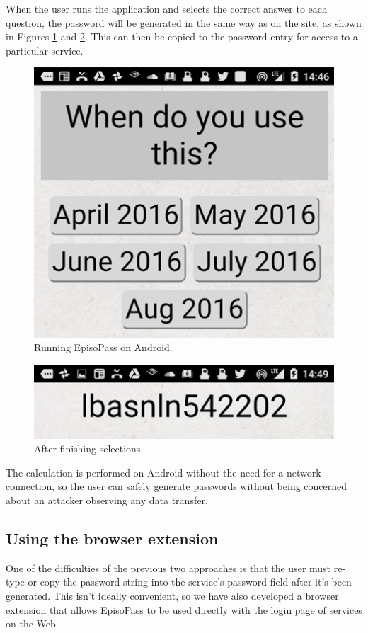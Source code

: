 \documentclass[runningheads,a4paper]{llncs}
\begin{document}
When the user runs the application and selects the correct answer
to each question, the password will be generated in the same way as
on the site, as shown in Figures \ref{android1} and \ref{android2}.
This can then be copied to the password entry for access
to a particular service.

\begin{figure}
\centering
\includegraphics[width=0.4\columnwidth]{figures/429eec261024dc6c85351f51c12f09b4}
\caption{Running EpisoPass on Android.}
\label{android1}
\end{figure}

\begin{figure}
\centering
\includegraphics[width=0.4\columnwidth]{figures/ba8f5aeaa935ad63437969f4d746746b}
\caption{After finishing selections.}
\label{android2}
\end{figure}

The calculation is performed on Android without the need for a network connection,
so the user can safely generate passwords without being concerned about an
attacker observing any data transfer.

\subsection{Using the browser extension}
\label{extensionsection}

One of the difficulties of the previous two approaches is that the user 
must re-type or copy the password string into the service's password
field after it's been generated.
This isn't ideally convenient, so we have also developed a browser 
extension that allows EpisoPass to be used directly with the login
page of services on the Web.
\end{document}
